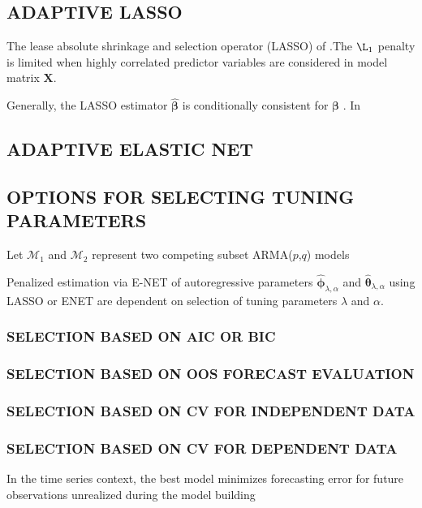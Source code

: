 \subsection{ADAPTIVE LASSO}
The lease absolute shrinkage and selection operator (LASSO) of \cite{Tibshirani1996}.The $\L_1$ penalty is limited when highly correlated predictor variables are considered in model matrix $\bm{X}$.

Generally, the LASSO estimator $\hat{\bm{\beta}}$ is conditionally consistent for $\bm{\beta}$ 
\cite{Zhao2006}.
In \cite{Zou2006}

\subsection{ADAPTIVE ELASTIC NET}


\subsection{OPTIONS FOR SELECTING TUNING PARAMETERS}
Let $\mathcal{M}_1$ and $\mathcal{M}_2$ represent two competing subset ARMA($p$,$q$) models

Penalized estimation via E-NET of autoregressive parameters $\hat{\bm{\phi}}_{\lambda,\alpha}$ and $\hat{\bm{\theta}}_{\lambda,\alpha}$ using LASSO or ENET are dependent on selection of tuning parameters $\lambda$ and  $\alpha$.

\subsubsection{SELECTION BASED ON AIC OR BIC}

\subsubsection{SELECTION BASED ON OOS FORECAST EVALUATION}

\subsubsection{SELECTION BASED ON CV FOR INDEPENDENT DATA}

\subsubsection{SELECTION BASED ON CV FOR DEPENDENT DATA}


In the time series context, the best model minimizes forecasting error for future observations  unrealized during the model building  

